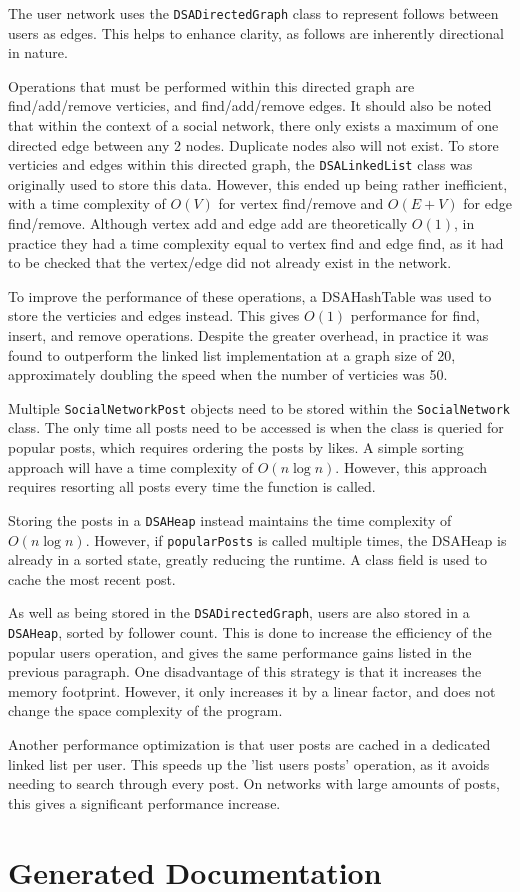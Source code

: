 \documentclass{article}
\begin{document}
The user network uses the \texttt{DSADirectedGraph} class to represent follows between users
as edges. This helps to enhance clarity, as follows are inherently directional in nature.

Operations that must be performed within this directed graph are find/add/remove verticies,
and find/add/remove edges. It should also be noted that within the context of a social network,
there only exists a maximum of one directed edge between any 2 nodes. Duplicate nodes also will not
exist.
To store verticies and edges within this directed graph, the \texttt{DSALinkedList} class was originally
used to store this data. However, this ended up being rather inefficient, with a time complexity of
$O\left(V\right)$ for vertex find/remove and $O\left(E + V\right)$ for edge find/remove.
Although vertex add and edge add are theoretically $O\left(1\right)$, in practice they had a time complexity
equal to vertex find and edge find, as it had to be checked that the vertex/edge did not already exist in the network.

To improve the performance of these operations, a DSAHashTable was used to store the verticies and edges instead.
This gives $O\left(1\right)$
performance for find, insert, and remove operations. Despite the greater overhead, in practice it was found to outperform
the linked list implementation at a graph size of 20, approximately doubling the speed when the number of verticies was 50.

Multiple \texttt{SocialNetworkPost} objects need to be stored within the \texttt{SocialNetwork} class.
The only time all posts need to be accessed
is when the class is queried for popular posts, which requires ordering the posts by likes.
A simple sorting approach will have a time complexity of $O\left(n\log n\right)$. However, this
approach requires resorting all posts every time the function is called.

Storing the posts in a \texttt{DSAHeap} instead maintains
the time complexity of $O\left(n\log n\right)$. However, if \texttt{popularPosts}
is called multiple times, the DSAHeap is already in a sorted state, greatly reducing the runtime.
A class field is used to cache the most recent post.

As well as being stored in the \texttt{DSADirectedGraph}, users are also stored in a \texttt{DSAHeap},
sorted by follower count. This is done to increase the efficiency of the popular users operation,
and gives the same performance gains listed in the previous paragraph.
One disadvantage of this strategy is that it increases the memory footprint. However, it only increases it
by a linear factor, and does not change the space complexity of the program.

Another performance optimization is that user posts are cached in a dedicated linked list per user.
This speeds up the 'list users posts' operation, as it avoids needing to search through every post. On networks with large amounts
of posts, this gives a significant performance increase.



\section{Generated Documentation}
\end{document}
